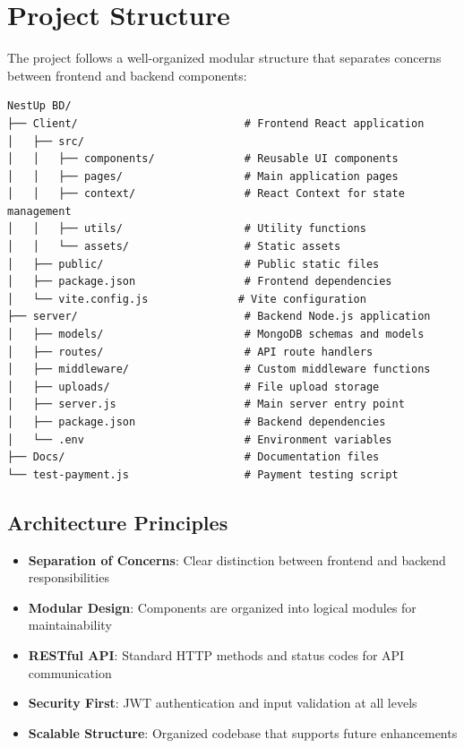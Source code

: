 \documentclass[12pt,a4paper]{article}
\begin{document}
\section{Project Structure}
\label{sec:project-structure}

The project follows a well-organized modular structure that separates concerns between frontend and backend components:

\begin{lstlisting}[caption=Project Directory Structure, label=lst:project-structure]
NestUp BD/
├── Client/                          # Frontend React application
│   ├── src/
│   │   ├── components/              # Reusable UI components
│   │   ├── pages/                   # Main application pages
│   │   ├── context/                 # React Context for state management
│   │   ├── utils/                   # Utility functions
│   │   └── assets/                  # Static assets
│   ├── public/                      # Public static files
│   ├── package.json                 # Frontend dependencies
│   └── vite.config.js              # Vite configuration
├── server/                          # Backend Node.js application
│   ├── models/                      # MongoDB schemas and models
│   ├── routes/                      # API route handlers
│   ├── middleware/                  # Custom middleware functions
│   ├── uploads/                     # File upload storage
│   ├── server.js                    # Main server entry point
│   ├── package.json                 # Backend dependencies
│   └── .env                         # Environment variables
├── Docs/                            # Documentation files
└── test-payment.js                  # Payment testing script
\end{lstlisting}

\subsection{Architecture Principles}
\label{subsec:architecture-principles}

\begin{itemize}
\item \textbf{Separation of Concerns}: Clear distinction between frontend and backend responsibilities
\item \textbf{Modular Design}: Components are organized into logical modules for maintainability
\item \textbf{RESTful API}: Standard HTTP methods and status codes for API communication
\item \textbf{Security First}: JWT authentication and input validation at all levels
\item \textbf{Scalable Structure}: Organized codebase that supports future enhancements
\end{itemize}
\end{document}
